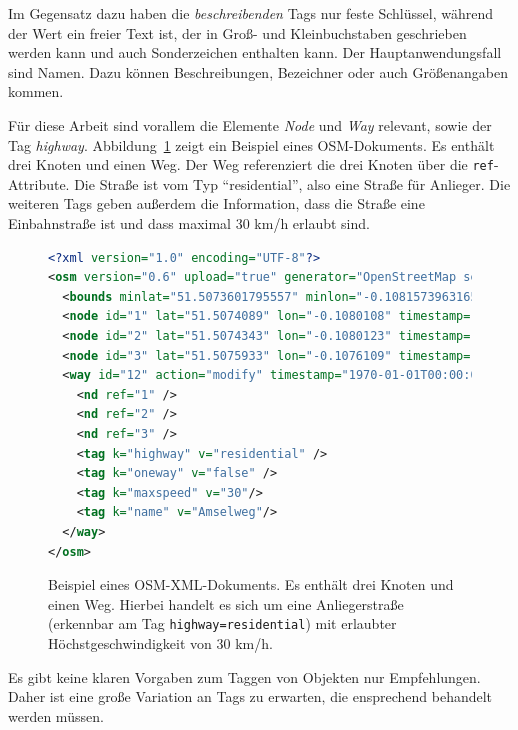 Im Gegensatz dazu haben die \emph{beschreibenden} Tags nur feste Schlüssel, während der Wert ein
freier Text ist, der in Groß- und Kleinbuchstaben geschrieben werden kann und auch Sonderzeichen
enthalten kann. Der Hauptanwendungsfall sind Namen. Dazu können Beschreibungen, Bezeichner oder auch
Größenangaben kommen.

Für diese Arbeit sind vorallem die Elemente \emph{Node} und \emph{Way} relevant, sowie der Tag
\emph{highway}. Abbildung~\ref{fig:osm_xml} zeigt ein Beispiel eines OSM-Dokuments. Es enthält drei
Knoten und einen Weg. Der Weg referenziert die drei Knoten über die \texttt{ref}-Attribute. Die
Straße ist vom Typ "`residential"', also eine Straße für Anlieger. Die weiteren Tags geben
außerdem die Information, dass die Straße eine Einbahnstraße ist und dass maximal 30 km/h
erlaubt sind.

\begin{figure}[h]
    \begin{lstlisting}[language=xml]
<?xml version="1.0" encoding="UTF-8"?>
<osm version="0.6" upload="true" generator="OpenStreetMap server">
  <bounds minlat="51.5073601795557" minlon="-0.108157396316528" maxlat="51.5076406454029" maxlon="-0.107599496841431"/>
  <node id="1" lat="51.5074089" lon="-0.1080108" timestamp="1970-01-01T00:00:01Z" user="matt" visible="true" version="1"/>
  <node id="2" lat="51.5074343" lon="-0.1080123" timestamp="1970-01-01T00:00:01Z" user="snsn1" visible="true" version="1"/>
  <node id="3" lat="51.5075933" lon="-0.1076109" timestamp="1970-01-01T00:00:01Z" user="snsn1" visible="true" version="1"/>
  <way id="12" action="modify" timestamp="1970-01-01T00:00:01Z" visible="true" version="3">
    <nd ref="1" />
    <nd ref="2" />
    <nd ref="3" />
    <tag k="highway" v="residential" />
    <tag k="oneway" v="false" /> 
    <tag k="maxspeed" v="30"/>
    <tag k="name" v="Amselweg"/>
  </way>
</osm>
\end{lstlisting}
    \caption[OSM-XML-Beispiel]{Beispiel eines OSM-XML-Dokuments. Es enthält drei Knoten und einen
        Weg. Hierbei handelt es sich um eine Anliegerstraße (erkennbar am
        Tag \texttt{highway=residential}) mit erlaubter Höchstgeschwindigkeit von 30 km/h.}
    \label{fig:osm_xml}
\end{figure}

Es gibt keine klaren Vorgaben zum Taggen von Objekten nur Empfehlungen. Daher ist eine große
Variation an Tags zu erwarten, die ensprechend behandelt werden müssen.


